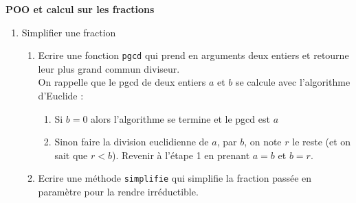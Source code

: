\documentclass[11pt,a4paper]{article}
\begin{document}
\begin{Exo}{\textbf{POO et calcul sur les fractions}}
\begin{enumerate}
\begin{enumerate}
	$A = \dfrac{3}{7}+\dfrac{4}{21}-\dfrac{5}{2}$ \qquad \qquad  $B = \dfrac{12}{5} - \dfrac{3}{5}\times \dfrac{7}{9}$ \qquad \qquad $C = 5 + \left(1+ \dfrac{1}{8}\right)\div\dfrac{3}{4}$
		\end{enumerate}
	\item Simplifier une fraction
	\begin{enumerate} 
		\item Ecrire une fonction {\tt pgcd} qui prend en arguments deux entiers et retourne leur plus grand commun diviseur.\\
	\aide \; On rappelle que le {\sc pgcd} de deux entiers $a$ et $b$ se calcule avec l'algorithme d'Euclide :
	\begin{enumerate}
		\item Si $b=0$ alors l'algorithme se termine et le {\sc pgcd} est $a$
		\item Sinon faire la division euclidienne de $a$, par $b$, on note $r$ le reste (et on sait que $r<b$). Revenir à l'étape 1 en prenant $a=b$ et $b=r$.
	\end{enumerate}
	\item Ecrire une méthode {\tt simplifie} qui simplifie  la fraction passée en paramètre pour la rendre irréductible.
		\end{enumerate}
	\end{enumerate}
\end{Exo}
\end{document}
